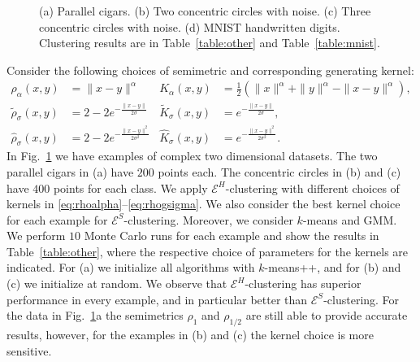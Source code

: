 \documentclass[aps,preprint,nofootinbib,floatfix]{revtex4-1}
\newcommand\kk{K}
\begin{document}
\begin{figure}
\begin{minipage}{0.23\textwidth}
\end{minipage}
\caption{\label{fig:other}
(a) Parallel cigars. (b) Two  
concentric circles with noise. (c) Three
concentric circles with noise. (d) MNIST handwritten digits.
Clustering results are in Table~\ref{table:other}
and Table~\ref{table:mnist}.
}
\end{figure}

Consider the following choices of semimetric and 
corresponding generating kernel:
\begin{align}
\rho_{\alpha}(x,y) &= \| x - y\|^\alpha & 
\kk_{\alpha}(x,y) &= \tfrac{1}{2}\left(
\| x \|^\alpha +
\| y \|^\alpha -
\| x-y \|^\alpha \right) ,
\label{eq:rhoalpha} \\
%
\widetilde{\rho}_{\sigma}(x,y) &= 2 - 2 e^{-\tfrac{\|x-y\|}{2 \sigma}} &
\widetilde{\kk}_{\sigma}(x,y) &= e^{-\tfrac{\|x-y\|}{2\sigma}} ,
\label{eq:rhoesigma} \\
%
\widehat{\rho}_{\sigma}(x,y) &= 2 - 2 e^{-\tfrac{\|x-y\|^2}{2 \sigma^2}} &
\widehat{\kk}_{\sigma}(x,y) &= e^{-\tfrac{\|x-y\|^2}{2\sigma^2}} .
\label{eq:rhogsigma} 
\end{align}
In Fig.~\ref{fig:other} we have examples of
complex two dimensional datasets. The two parallel cigars in (a)
have $200$ points each. The concentric circles
in (b) and (c) have $400$ points for each class.
We apply $\mathcal{E}^H$-clustering  with different choices
of kernels in \eqref{eq:rhoalpha}--\eqref{eq:rhogsigma}. We also consider
the best kernel choice for each example for $\mathcal{E}^S$-clustering. 
Moreover, we consider
$k$-means and GMM. We perform $10$ Monte Carlo runs for each example
and show the results in Table~\ref{table:other}, where the respective 
choice of parameters for the kernels are indicated. For (a) we initialize
all algorithms with $k$-means++, and for (b) and (c) we initialize at
random.
We observe that $\mathcal{E}^H$-clustering has superior performance
in every example, and in particular better than $\mathcal{E}^S$-clustering.
For the data in Fig.~\ref{fig:other}a 
the semimetrics $\rho_1$ and $\rho_{1/2}$ are
still able to provide accurate results, however, for the
examples in (b) and (c) the kernel choice is more sensitive.
\end{document}
